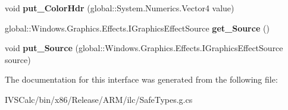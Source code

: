 \begin{DoxyCompactItemize}
\mbox{\label{interface_microsoft_1_1_graphics_1_1_canvas_1_1_effects_1_1_i_chroma_key_effect_a447f4766d334b038907b48a52e620a3e}} 
void {\bfseries put\+\_\+\+Color\+Hdr} (global\+::\+System.\+Numerics.\+Vector4 value)
\item 
\mbox{\label{interface_microsoft_1_1_graphics_1_1_canvas_1_1_effects_1_1_i_chroma_key_effect_acfa05ded159676e9b1994b8e8270e4e8}} 
global\+::\+Windows.\+Graphics.\+Effects.\+I\+Graphics\+Effect\+Source {\bfseries get\+\_\+\+Source} ()
\item 
\mbox{\label{interface_microsoft_1_1_graphics_1_1_canvas_1_1_effects_1_1_i_chroma_key_effect_adc09a51a1f8c52117c829caa0a7c9481}} 
void {\bfseries put\+\_\+\+Source} (global\+::\+Windows.\+Graphics.\+Effects.\+I\+Graphics\+Effect\+Source source)
\end{DoxyCompactItemize}


The documentation for this interface was generated from the following file\+:\begin{DoxyCompactItemize}
\item 
I\+V\+S\+Calc/bin/x86/\+Release/\+A\+R\+M/ilc/Safe\+Types.\+g.\+cs\end{DoxyCompactItemize}
